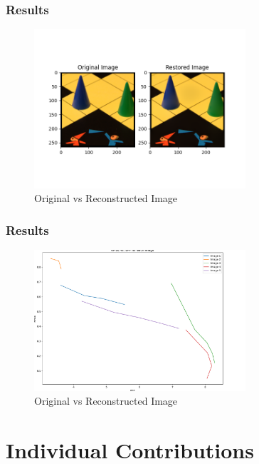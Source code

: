 \documentclass[Serif, 10pt, brown]{beamer}
\theoremstyle{example}
\theoremstyle{plain}
\begin{document}
\begin{frame}
	\frametitle{Results}
	\begin{figure}
		\centering
		\includegraphics[width=0.7\textwidth]{../results/try_11_4.png}
		\caption{Original vs Reconstructed Image}
	\end{figure}
\end{frame}

\begin{frame}
	\frametitle{Results}
	\begin{figure}
		\centering
		\includegraphics[width=0.7\textwidth]{../results/paper.png}
		\caption{Original vs Reconstructed Image}
	\end{figure}
\end{frame}




\section{Individual Contributions}
\end{document}
